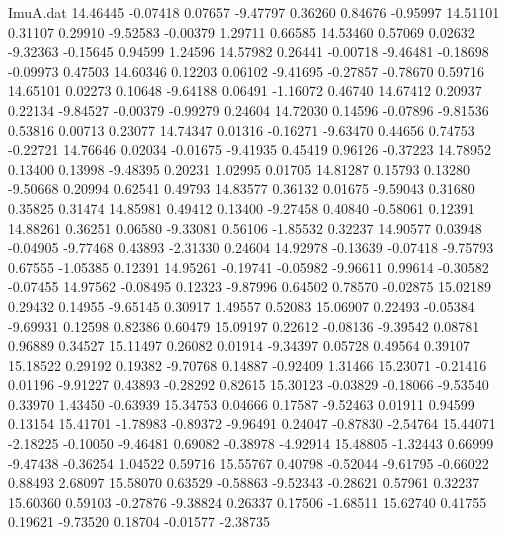 \begin{filecontents}{ImuA.dat}
  14.46445   -0.07418    0.07657   -9.47797    0.36260    0.84676   -0.95997
  14.51101    0.31107    0.29910   -9.52583   -0.00379    1.29711    0.66585
  14.53460    0.57069    0.02632   -9.32363   -0.15645    0.94599    1.24596
  14.57982    0.26441   -0.00718   -9.46481   -0.18698   -0.09973    0.47503
  14.60346    0.12203    0.06102   -9.41695   -0.27857   -0.78670    0.59716
  14.65101    0.02273    0.10648   -9.64188    0.06491   -1.16072    0.46740
  14.67412    0.20937    0.22134   -9.84527   -0.00379   -0.99279    0.24604
  14.72030    0.14596   -0.07896   -9.81536    0.53816    0.00713    0.23077
  14.74347    0.01316   -0.16271   -9.63470    0.44656    0.74753   -0.22721
  14.76646    0.02034   -0.01675   -9.41935    0.45419    0.96126   -0.37223
  14.78952    0.13400    0.13998   -9.48395    0.20231    1.02995    0.01705
  14.81287    0.15793    0.13280   -9.50668    0.20994    0.62541    0.49793
  14.83577    0.36132    0.01675   -9.59043    0.31680    0.35825    0.31474
  14.85981    0.49412    0.13400   -9.27458    0.40840   -0.58061    0.12391
  14.88261    0.36251    0.06580   -9.33081    0.56106   -1.85532    0.32237
  14.90577    0.03948   -0.04905   -9.77468    0.43893   -2.31330    0.24604
  14.92978   -0.13639   -0.07418   -9.75793    0.67555   -1.05385    0.12391
  14.95261   -0.19741   -0.05982   -9.96611    0.99614   -0.30582   -0.07455
  14.97562   -0.08495    0.12323   -9.87996    0.64502    0.78570   -0.02875
  15.02189    0.29432    0.14955   -9.65145    0.30917    1.49557    0.52083
  15.06907    0.22493   -0.05384   -9.69931    0.12598    0.82386    0.60479
  15.09197    0.22612   -0.08136   -9.39542    0.08781    0.96889    0.34527
  15.11497    0.26082    0.01914   -9.34397    0.05728    0.49564    0.39107
  15.18522    0.29192    0.19382   -9.70768    0.14887   -0.92409    1.31466
  15.23071   -0.21416    0.01196   -9.91227    0.43893   -0.28292    0.82615
  15.30123   -0.03829   -0.18066   -9.53540    0.33970    1.43450   -0.63939
  15.34753    0.04666    0.17587   -9.52463    0.01911    0.94599    0.13154
  15.41701   -1.78983   -0.89372   -9.96491    0.24047   -0.87830   -2.54764
  15.44071   -2.18225   -0.10050   -9.46481    0.69082   -0.38978   -4.92914
  15.48805   -1.32443    0.66999   -9.47438   -0.36254    1.04522    0.59716
  15.55767    0.40798   -0.52044   -9.61795   -0.66022    0.88493    2.68097
  15.58070    0.63529   -0.58863   -9.52343   -0.28621    0.57961    0.32237
  15.60360    0.59103   -0.27876   -9.38824    0.26337    0.17506   -1.68511
  15.62740    0.41755    0.19621   -9.73520    0.18704   -0.01577   -2.38735

\end{filecontents}
